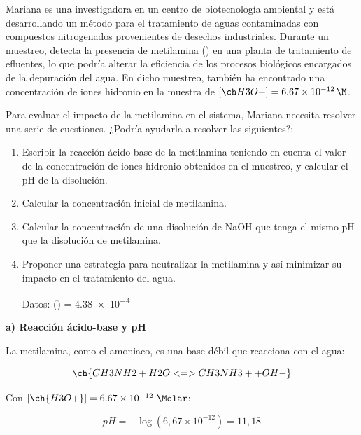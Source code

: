 \begin{exerciseEVAU}

Mariana es una investigadora en un centro de biotecnología ambiental y está desarrollando un
método para el tratamiento de aguas contaminadas con compuestos nitrogenados provenientes de
desechos industriales. Durante un muestreo, detecta la presencia de metilamina () en una
planta de tratamiento de efluentes, lo que podría alterar la eficiencia de los procesos biológicos
encargados de la depuración del agua. En dicho muestreo, también ha encontrado una concentración
de iones hidronio en la muestra de \( \conc{H3O+} = \qty{6.67e-12}{\M} \).


Para evaluar el impacto de la metilamina en el sistema, Mariana necesita resolver una serie de
cuestiones. ¿Podría ayudarla a resolver las siguientes?:
\begin{enumerate}[label=\letraminuscula]
    \item Escribir la reacción ácido-base de la metilamina teniendo en cuenta el valor de la
concentración de iones hidronio obtenidos en el muestreo, y calcular el pH de la disolución.
    \item Calcular la concentración inicial de metilamina.
    \item Calcular la concentración de una disolución de NaOH que tenga el mismo pH
que la disolución de metilamina.
    \item Proponer una estrategia para neutralizar la metilamina y así minimizar su
impacto en el tratamiento del agua.

Datos: \Kb () = \num{4.38e-4}


\end{enumerate}

\begin{solu}

    \textbf{a) Reacción ácido-base y pH}

    La metilamina, como el amoniaco, es una base débil que reacciona con el agua:

    \begin{equation*}
        \ch{CH3NH2 + H2O <=> CH3NH3+ + OH-}
    \end{equation*}

    Con \([\ch{H3O+}] = \num{6.67e-12} \ \si{\Molar}\):

    \begin{equation*}
        pH = -\log(6,67 \times 10^{-12}) = 11,18
    \end{equation*}


\end{solu}
\end{exerciseEVAU}
